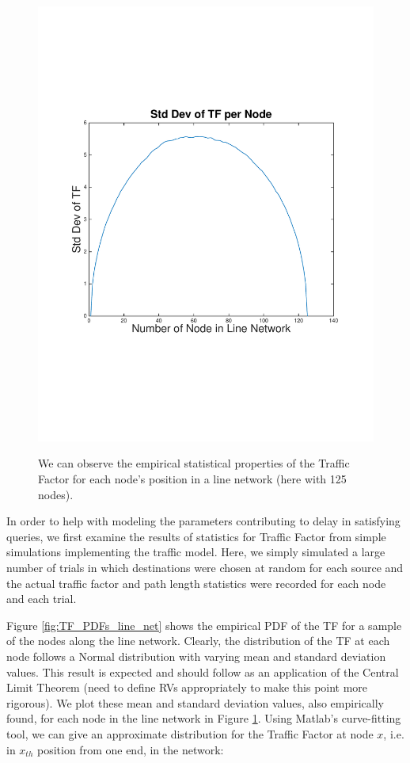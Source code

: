 \begin{figure}
\begin{centering}
{    		\includegraphics[scale=0.4, clip=true, trim=15mm 65mm 20mm 65mm]{figures/std_dev_TF_each_node_line_net_125.pdf}
		\label{fig:std_dev_TF_each_node_line_net}
		}
	\caption{We can observe the empirical statistical properties of the Traffic Factor for each node's position in a line network (here with 125 nodes).}
	\label{fig:TF_empirical_stats_each_node_line_net}
\end{centering}
\end{figure}

In order to help with modeling the parameters contributing to delay in satisfying queries, we first examine the results of statistics for Traffic Factor from simple simulations implementing the traffic model.  Here, we simply simulated a large number of trials in which destinations were chosen at random for each source and the actual traffic factor and path length statistics were recorded for each node and each trial.  

Figure \ref{fig:TF_PDFs_line_net} shows the empirical PDF of the TF for a sample of the nodes along the line network.  Clearly, the distribution of the TF at each node follows a Normal distribution with varying mean and standard deviation values.  This result is expected and should follow as an application of the Central Limit Theorem (need to define RVs appropriately to make this point more rigorous).  We plot these mean and standard deviation values, also empirically found, for each node in the line network in Figure \ref{fig:TF_empirical_stats_each_node_line_net}.  Using Matlab's curve-fitting tool, we can give an approximate distribution for the Traffic Factor at node $x$, i.e. in $x_{th}$ position from one end, in the network:


